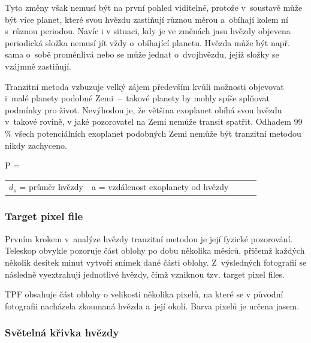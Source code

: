 \documentclass[a4paper,12pt]{article}
\begin{document}
{
\drawgimp

Tyto změny však nemusí být na první pohled viditelné, protože v~soustavě může být více planet, které svou hvězdu zastiňují různou měrou a~obíhají kolem ní s~různou periodou. Navíc i v situaci, kdy je ve změnách jasu hvězdy objevena periodická složka nemusí jít vždy o~obíhající planetu. Hvězda může být např. sama o~sobě proměnlivá nebo se může jednat o~dvojhvězdu, jejíž složky se vzájmně zastiňují.~\cite{kepler80}

Tranzitní metoda vzbuzuje velký zájem především kvůli možnosti objevovat i~malé planety podobné Zemi~--~takové planety by mohly spíše splňovat podmínky pro život. Nevýhodou je, že většina exoplanet obíhá svou hvězdu v~takové rovině, v jaké pozorovatel na Zemi nemůže transit spatřit. Odhadem 99 \% všech potenciálních exoplanet podobných Zemi nemůže být tranzitní metodou nikdy zachyceno.~\cite{methods,transit}

 {P = }{
\begin{tabular}{llll}
	$d_s$ = průměr hvězdy & a = vzdálenost exoplanety od hvězdy \
\end{tabular}
}


\subsubsection{Target pixel file}

Prvním krokem v~analýze hvězdy tranzitní metodou je její fyzické pozorování. Teleskop obvykle pozoruje část oblohy po dobu několika měsíců, přičemž každých několik desítek minut vytvoří snímek dané části oblohy. Z~výsledných fotografií se následně vyextrahují jednotlivé hvězdy, čímž vzniknou tzv. target pixel files.

TPF obsahuje část oblohy o velikosti několika pixelů, na které se v původní fotografii nacházela zkoumaná hvězda a~její okolí. Barva pixelů je určena jasem.

\data{1}{nasadata}

\subsubsection{Světelná křivka hvězdy}

}
\end{document}
